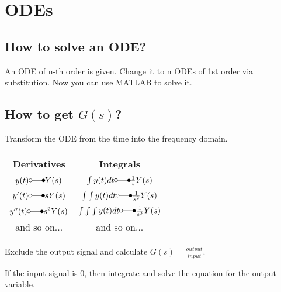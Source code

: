 \section{ODEs}

\subsection{How to solve an ODE?}

An ODE of n-th order is given. Change it to n ODEs of 1st order via substitution. Now you can use MATLAB to solve it.


\subsection{How to get $G(s)$?}

Transform the ODE from the time into the frequency domain.

\begin{tabular}{c|c}
	 Derivatives  & Integrals  \\ \hline
	 \(y(t) \laplace Y(s)\) 						&  \(\int y(t) dt \laplace \frac{1}{s} Y(s)\) \\
	 \(y^\prime (t) \laplace s Y(s)\)				&  \(\int\int y(t) dt \laplace \frac{1}{s^2} Y(s) \)  \\ 
	 \(y^{\prime\prime} (t) \laplace s^2 Y(s)\)  	&  \(\int\int\int y(t) dt \laplace \frac{1}{s^3} Y(s)\) \\
	 and so on... & and so on...
\end{tabular} 

Exclude the output signal and calculate $G(s)= \frac{output}{input}$. 


If the input signal is $0$, then integrate and solve the equation for the output variable.

